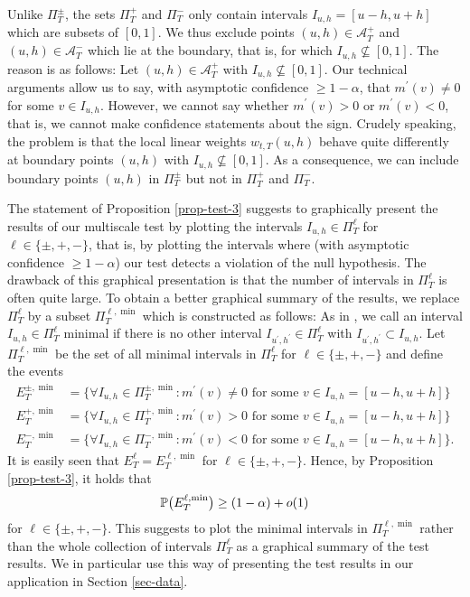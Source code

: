 \begin{remark}
Unlike $\Pi_T^\pm$, the sets $\Pi_T^+$ and $\Pi_T^-$ only contain intervals $I_{u,h} = [u-h,u+h]$ which are subsets of $[0,1]$. We thus exclude points $(u,h) \in \mathcal{A}_T^+$ and $(u,h) \in \mathcal{A}_T^-$ which lie at the boundary, that is, for which $I_{u,h} \nsubseteq [0,1]$. The reason is as follows: Let $(u,h) \in \mathcal{A}_T^+$ with $I_{u,h} \nsubseteq [0,1]$. Our technical arguments allow us to say, with asymptotic confidence $\ge 1 - \alpha$, that $m^\prime(v) \ne 0$ for some $v \in I_{u,h}$. However, we cannot say whether $m^\prime(v) > 0$ or $m^\prime(v) < 0$, that is, we cannot make confidence statements about the sign. Crudely speaking, the problem is that the local linear weights $w_{t,T}(u,h)$ behave quite differently at boundary points $(u,h)$ with $I_{u,h} \nsubseteq [0,1]$. As a consequence, we can include boundary points $(u,h)$ in $\Pi_T^\pm$ but not in $\Pi_T^+$ and $\Pi_T^-$.
\end{remark}
 

The statement of Proposition \ref{prop-test-3} suggests to graphically present the results of our multiscale test by plotting the intervals $I_{u,h} \in \Pi_T^\ell$ for $\ell \in \{\pm, +,-\}$, that is, by plotting the intervals where (with asymptotic confidence $\ge 1-\alpha$) our test detects a violation of the null hypothesis. The drawback of this graphical presentation is that the number of intervals in $\Pi_T^\ell$ is often quite large. To obtain a better graphical summary of the results, we replace $\Pi_T^\ell$ by a subset $\Pi_T^{\ell,\min}$ which is constructed as follows: As in \cite{Duembgen2002}, we call an interval $I_{u,h} \in \Pi_T^\ell$ minimal if there is no other interval $I_{u^\prime,h^\prime} \in \Pi_T^\ell$ with $I_{u^\prime,h^\prime} \subset I_{u,h}$. Let $\Pi_T^{\ell,\min}$ be the set of all minimal intervals in $\Pi_T^\ell$ for $\ell \in \{\pm, +,-\}$ and define the events
\begin{align*}
E_T^{\pm,\min} & = \Big\{ \forall I_{u,h} \in \Pi_T^{\pm,\min}: m^\prime(v) \ne 0 \text{ for some } v \in I_{u,h} = [u-h,u+h] \Big\} \\
E_T^{+,\min} & = \Big\{ \forall I_{u,h} \in \Pi_T^{+,\min}: m^\prime(v) > 0 \text{ for some } v \in I_{u,h} = [u-h,u+h] \Big\} \\ 
E_T^{-,\min} & = \Big\{ \forall I_{u,h} \in \Pi_T^{-,\min}: m^\prime(v) < 0 \text{ for some } v \in I_{u,h} = [u-h,u+h] \Big\}.  
\end{align*}
It is easily seen that $E_T^\ell = E_T^{\ell,\min}$ for $\ell \in \{\pm, +,-\}$. Hence, by Proposition \ref{prop-test-3}, it holds that 
\[ \mathbb{P} \big(E_T^{\ell,\min}\big) \ge (1-\alpha) + o(1) \] 
for $\ell \in \{\pm, +,-\}$. This suggests to plot the minimal intervals in $\Pi_T^{\ell,\min}$ rather than the whole collection of intervals $\Pi_T^\ell$ as a graphical summary of the test results. We in particular use this way of presenting the test results in our application in Section \ref{sec-data}. 



